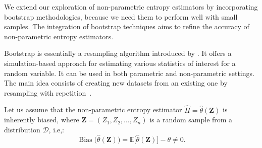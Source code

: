 We extend our exploration of non-parametric entropy estimators by incorporating  bootstrap methodologies, because we need them to perform well with small samples. 
The integration of bootstrap techniques aims to refine the accuracy of non-parametric entropy estimators.

Bootstrap is essentially a resampling algorithm introduced by \citep{Efron1979}. 
It offers a simulation-based approach for estimating various statistics of interest for a random variable.
It can be used in both parametric and non-parametric settings. 
The main idea  consists of creating new datasets from an existing one by resampling with repetition~\citep{Michelucci2021}.

Let us assume that the non-parametric entropy estimator
\(\widehat{H}=\widehat{\theta}(\bm{Z})\) is inherently biased, where \(\bm{Z}=(Z_1, Z_2,\ldots,Z_n)\) is a random sample from a
distribution \(\mathcal{D}\), i.e,:\begin{equation}
\label{Eq:bias1}
\operatorname{Bias}\big(\widehat{\theta}(\bm{Z})\big) = \mathbb{E}\big[\widehat{\theta}(\bm{Z})\big] - \theta \neq 0.
\end{equation} 

